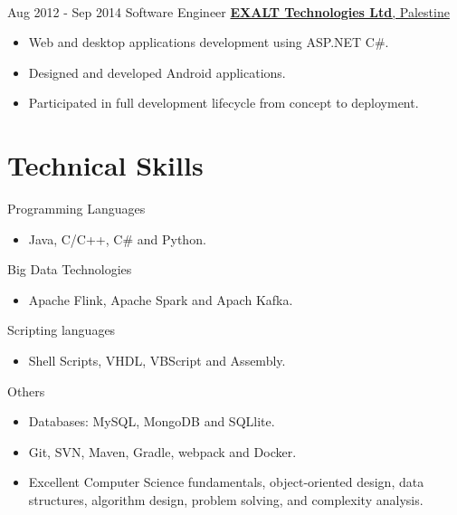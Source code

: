 \documentclass[letterpaper]{twentysecondcv} %
\begin{document}
\begin{twenty}
{{\begin{itemize}
        
    \end{itemize}}
        }
     \\
     \twentyitem
   		{Aug 2012 -}
		{Sep 2014}
        {Software Engineer}
        {\href{http://www.exalt-tech.com/about/}{\large\textbf{EXALT Technologies Ltd}, Palestine}}
        {}
        {
        \begin{itemize}
        \item Web and desktop applications development using ASP.NET C\#.
        \item Designed and developed Android applications. 
        \item Participated in full development lifecycle from concept to deployment.
        
    \end{itemize}
    	}
        
\end{twenty}

\section{Technical  Skills}
\begin{twenty} %
	\twentyitem
	{}
	{}
	{Programming Languages}
	{}
	{}
	{ \begin{itemize}
			\item Java, C/C++, C\# and  Python.	\\	
	\end{itemize}}
		\twentyitem
	{}
	{}
	{Big Data Technologies}
	{}
	{}
	{ \begin{itemize}
			\item Apache Flink,  Apache
			Spark and Apach Kafka.	\\	
	\end{itemize}}

		\twentyitem
{}
{}
{Scripting languages}
{}
{}
{ \begin{itemize}
		\item Shell Scripts, VHDL, VBScript and Assembly.	\\	
\end{itemize}}



	\twentyitem
{}
{}
{Others}
{}
{}
{ \begin{itemize}
		\item Databases: MySQL, MongoDB and SQLlite.
		\item Git, SVN, Maven, Gradle, webpack and Docker.
		\item Excellent Computer Science fundamentals, object-oriented design, data structures, algorithm design, problem solving, and complexity analysis.
		
		
\end{itemize}}
\end{twenty}
\end{document}
